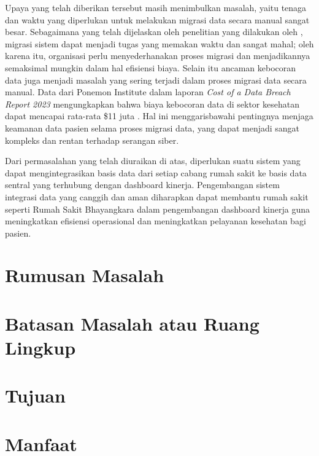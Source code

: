 Upaya yang telah diberikan tersebut masih menimbulkan masalah, yaitu tenaga dan waktu yang diperlukan untuk melakukan migrasi data secara manual sangat besar. 
Sebagaimana yang telah dijelaskan oleh penelitian yang dilakukan oleh \textcite{Elamparithi2015}, migrasi 
sistem dapat menjadi tugas yang memakan waktu dan sangat mahal; oleh karena itu, organisasi perlu 
menyederhanakan proses migrasi dan menjadikannya semaksimal mungkin dalam hal efisiensi 
biaya. Selain itu ancaman kebocoran data juga menjadi masalah yang sering terjadi dalam proses migrasi data secara manual.
Data dari Ponemon Institute dalam laporan \emph{Cost of a Data Breach Report 2023 } mengungkapkan bahwa biaya kebocoran data di sektor 
kesehatan dapat mencapai rata-rata \$11 juta \parencite{Ponemon2023}. Hal ini menggarisbawahi pentingnya menjaga keamanan data pasien selama proses migrasi data, 
yang dapat menjadi sangat kompleks dan rentan terhadap serangan siber.

Dari permasalahan yang telah diuraikan di atas, diperlukan suatu sistem yang dapat mengintegrasikan basis data dari setiap cabang rumah sakit ke basis data sentral
yang terhubung dengan dashboard kinerja. Pengembangan sistem integrasi data yang canggih dan aman diharapkan dapat membantu rumah sakit seperti Rumah Sakit Bhayangkara dalam 
pengembangan dashboard kinerja guna meningkatkan efisiensi operasional dan meningkatkan pelayanan kesehatan bagi pasien. 

\section{Rumusan Masalah}

\section{Batasan Masalah atau Ruang Lingkup}

\section{Tujuan}

\section{Manfaat}


